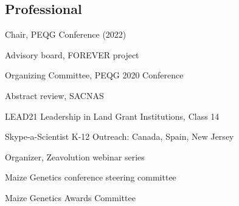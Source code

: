 \documentclass[letterpaper,10pt]{article}
\renewenvironment{itemize}{
  \begin{list}{}{
    \setlength{\leftmargin}{1.5em}
  }
}{
  \end{list}
}
\begin{document}
\begin{itemize}
\subsection*{Professional}
\item Chair, PEQG Conference (2022)%
\item Advisory board, FOREVER project %
\item Organizing Committee, PEQG 2020 Conference%
\item Abstract review, SACNAS
\item LEAD21 Leadership in Land Grant Institutions, Class 14%
\item Skype-a-Scientist K-12 Outreach: Canada, Spain, New Jersey%
\item Organizer, Zeavolution webinar series %
\item Maize Genetics conference steering committee%
\item Maize Genetics Awards Committee%

\end{itemize}
\end{document}
